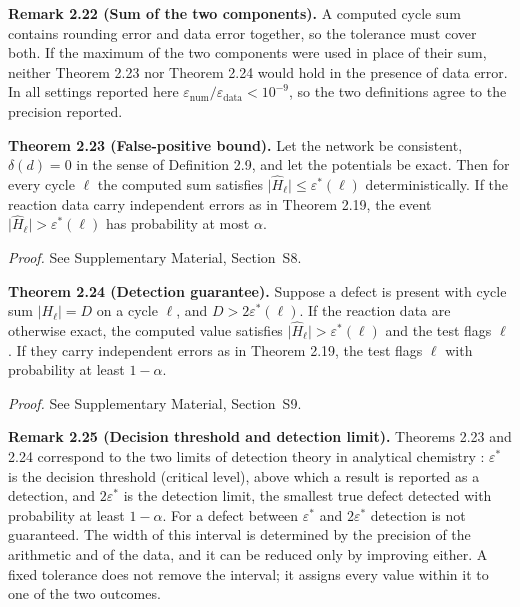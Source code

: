 \documentclass[11pt,a4paper]{article}
\theoremstyle{pstyle}
\theoremstyle{definition}
\theoremstyle{remark}
\newcommand{\abs}[1]{\lvert#1\rvert}
\newcommand{\eps}{\varepsilon}
\newcommand{\epsnum}{\eps_{\mathrm{num}}}
\newcommand{\epsdata}{\eps_{\mathrm{data}}}
\newcommand{\epsstar}{\eps^{\ast}}
\newcommand{\hol}{H}
\begin{document}
\par\noindent\textbf{Remark 2.22 (Sum of the two components).}\label{rem:sum-not-max} 
A computed cycle sum contains rounding error and data error together,
so the tolerance must cover both. If the maximum of the two components
were used in place of their sum, neither Theorem 2.23
nor Theorem 2.24 would hold in the presence of data error. In
all settings reported here $\epsnum/\epsdata<10^{-9}$, so the two
definitions agree to the precision reported.
\par

\par\noindent\textbf{Theorem 2.23 (False-positive bound).}\label{thm:no-false-positive} 
Let the network be consistent, $\delta(d)=0$ in the sense of
Definition 2.9, and let the potentials be exact. Then for every
cycle $\ell$ the computed sum satisfies
$\abs{\widehat{\hol}_\ell} \le \epsstar(\ell)$ deterministically. If
the reaction data carry independent errors as in
Theorem 2.19, the event $\abs{\widehat{\hol}_\ell} >
\epsstar(\ell)$ has probability at most $\alpha$.
\par

\noindent\emph{Proof.} See Supplementary Material, Section~S8.

\par\noindent\textbf{Theorem 2.24 (Detection guarantee).}\label{thm:detection} 
Suppose a defect is present with cycle sum $\abs{\hol_\ell} = D$ on a
cycle $\ell$, and $D > 2\epsstar(\ell)$. If the reaction data are
otherwise exact, the computed value satisfies
$\abs{\widehat{\hol}_\ell} > \epsstar(\ell)$ and the test flags $\ell$.
If they carry independent errors as in Theorem 2.19, the test
flags $\ell$ with probability at least $1-\alpha$.
\par

\noindent\emph{Proof.} See Supplementary Material, Section~S9.

\par\noindent\textbf{Remark 2.25 (Decision threshold and detection limit).}\label{rem:factor2} 
Theorems 2.23 and 2.24 correspond to the two limits
of detection theory in analytical chemistry \citep{currie1968}:
$\epsstar$ is the decision threshold (critical level), above which a
result is reported as a detection, and $2\epsstar$ is the detection
limit, the smallest true defect detected with probability at least
$1-\alpha$. For a defect between $\epsstar$ and $2\epsstar$ detection is
not guaranteed. The width of this interval is determined by the
precision of the arithmetic and of the data, and it can be reduced only
by improving either. A fixed tolerance does not remove the interval; it
assigns every value within it to one of the two outcomes.
\par
\end{document}
